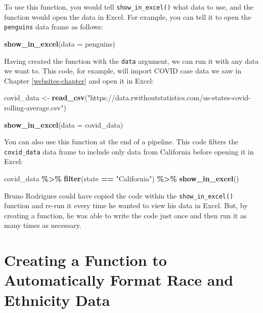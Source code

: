 \documentclass[
]{book}
\newenvironment{Shaded}{\begin{snugshade}}{\end{snugshade}}
\newcommand{\AttributeTok}[1]{\textcolor[rgb]{0.13,0.29,0.53}{#1}}
\newcommand{\FunctionTok}[1]{\textcolor[rgb]{0.13,0.29,0.53}{\textbf{#1}}}
\newcommand{\NormalTok}[1]{#1}
\newcommand{\OtherTok}[1]{\textcolor[rgb]{0.56,0.35,0.01}{#1}}
\newcommand{\SpecialCharTok}[1]{\textcolor[rgb]{0.81,0.36,0.00}{\textbf{#1}}}
\newcommand{\StringTok}[1]{\textcolor[rgb]{0.31,0.60,0.02}{#1}}
\begin{document}
To use this function, you would tell \texttt{show\_in\_excel()} what data to use, and the function would open the data in Excel. For example, you can tell it to open the \texttt{penguins} data frame as follows:

\begin{Shaded}
\begin{Highlighting}[]
\FunctionTok{show\_in\_excel}\NormalTok{(}\AttributeTok{data =}\NormalTok{ penguins)}
\end{Highlighting}
\end{Shaded}

Having created the function with the \texttt{data} argument, we can run it with any data we want to. This code, for example, will import COVID case data we saw in Chapter \ref{websites-chapter} and open it in Excel:

\begin{Shaded}
\begin{Highlighting}[]
\NormalTok{covid\_data }\OtherTok{\textless{}{-}} \FunctionTok{read\_csv}\NormalTok{(}\StringTok{"https://data.rwithoutstatistics.com/us{-}states{-}covid{-}rolling{-}average.csv"}\NormalTok{)}

\FunctionTok{show\_in\_excel}\NormalTok{(}\AttributeTok{data =}\NormalTok{ covid\_data)}
\end{Highlighting}
\end{Shaded}

You can also use this function at the end of a pipeline. This code filters the \texttt{covid\_data} data frame to include only data from California before opening it in Excel:

\begin{Shaded}
\begin{Highlighting}[]
\NormalTok{covid\_data }\SpecialCharTok{\%\textgreater{}\%} 
  \FunctionTok{filter}\NormalTok{(state }\SpecialCharTok{==} \StringTok{"California"}\NormalTok{) }\SpecialCharTok{\%\textgreater{}\%} 
  \FunctionTok{show\_in\_excel}\NormalTok{()}
\end{Highlighting}
\end{Shaded}

Bruno Rodrigues could have copied the code within the \texttt{show\_in\_excel()} function and re-run it every time he wanted to view his data in Excel. But, by creating a function, he was able to write the code just once and then run it as many times as necessary.

\hypertarget{creating-a-function-to-automatically-format-race-and-ethnicity-data}{%
\section*{Creating a Function to Automatically Format Race and Ethnicity Data}\label{creating-a-function-to-automatically-format-race-and-ethnicity-data}}
\end{document}
